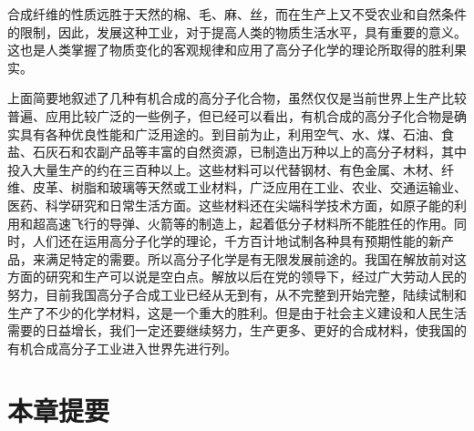 \begin{figure}
\centering
{}

\end{figure}

合成纤维的性质远胜于天然的棉、毛、麻、丝，而在生产上又不受农业和自然条件的限制，因此，发展这种工业，对于提高人类的物质生活水平，具有重要的意义。这也是人类掌握了物质变化的客观规律和应用了高分子化学的理论所取得的胜利果实。

上面简要地叙述了几种有机合成的高分子化合物，虽然仅仅是当前世界上生产比较普遍、应用比较广泛的一些例子，但已经可以看出，有机合成的高分子化合物是确实具有各种优良性能和广泛用途的。到目前为止，利用空气、水、煤、石油、食盐、石灰石和农副产品等丰富的自然资源，已制造出万种以上的高分子材料，其中投入大量生产的约在三百种以上。这些材料可以代替钢材、有色金属、木材、纤维、皮革、树脂和玻璃等天然或工业材料，广泛应用在工业、农业、交通运输业、医药、科学研究和日常生活方面。这些材料还在尖端科学技术方面，如原子能的利用和超高速飞行的导弹、火箭等的制造上，起着低分子材料所不能胜任的作用。同时，人们还在运用高分子化学的理论，千方百计地试制各种具有预期性能的新产品，来满足特定的需要。所以高分子化学是有无限发展前途的。我国在解放前对这方面的研究和生产可以说是空白点。解放以后在党的领导下，经过广大劳动人民的努力，目前我国高分子合成工业已经从无到有，从不完整到开始完整，陆续试制和生产了不少的化学材料，这是一个重大的胜利。但是由于社会主义建设和人民生活需要的日益增长，我们一定还要继续努力，生产更多、更好的合成材料，使我国的有机合成高分子工业进入世界先进行列。

\section{本章提要}

